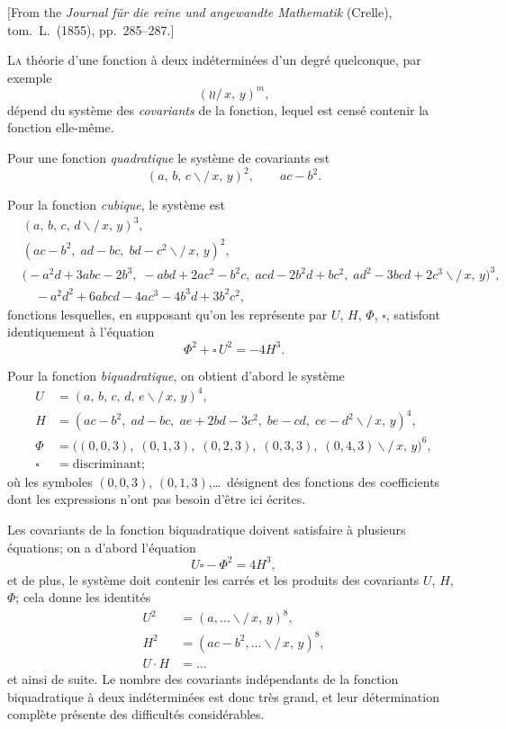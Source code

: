 \documentclass[11pt,a4paper]{book}
\begin{document}
[From the \textit{Journal f\"ur die reine und angewandte Mathematik} (Crelle),
tom.\ L.\ (1855), pp.\ 285--287.]

\medskip

\textsc{La} th\'eorie d'une fonction \`a deux ind\'etermin\'ees d'un degr\'e
quelconque, par exemple
\[
(\wr\wr\!\!\!/\,x,\, y)^m,
\]
d\'epend du syst\`eme des \textit{covariants} de la fonction, lequel est
cens\'e contenir la fonction elle-m\^eme.

Pour une fonction \textit{quadratique} le syst\`eme de covariants est
\[
(a,\, b,\, c\!\!\backslash\!\!\!/\,x,\, y)^2,\qquad ac-b^2.
\]

Pour la fonction \textit{cubique}, le syst\`eme est
\begin{align*}
&(a,\, b,\, c,\, d\!\!\backslash\!\!\!/\,x,\, y)^3, \\
&(ac-b^2,\; ad-bc,\; bd-c^2 \backslash\!\!\!/\,x,\, y)^2, \\
&\bigl(-a^2d + 3abc - 2b^3,\; -abd + 2ac^2 - b^2c,\;
acd - 2b^2d + bc^2,\; ad^2 - 3bcd + 2c^3 \backslash\!\!\!/\,x,\, y\bigr)^3, \\
&\quad -a^2d^2 + 6abcd - 4ac^3 - 4b^3d + 3b^2c^2,
\end{align*}
fonctions lesquelles, en supposant qu'on les repr\'esente par $U$, $H$,
$\Phi$, $\square$, satisfont identiquement \`a l'\'equation
\[
\Phi^2 + \square\,U^2 = -4H^3.
\]

Pour la fonction \textit{biquadratique}, on obtient d'abord le syst\`eme
\begin{align*}
U &= (a,\, b,\, c,\, d,\, e\!\!\backslash\!\!\!/\,x,\, y)^4, \\
H &= (ac-b^2,\; ad-bc,\; ae + 2bd - 3c^2,\; be-cd,\; ce-d^2
\backslash\!\!\!/\,x,\, y)^4, \\
\Phi &= \bigl( (0,0,3),\; (0,1,3),\; (0,2,3),\; (0,3,3),\;
(0,4,3) \backslash\!\!\!/\,x,\, y\bigr)^6, \\
\square &= \text{discriminant};
\end{align*}
o\`u les symboles $(0,0,3)$, $(0,1,3)$,\ldots\ d\'esignent des fonctions
des coefficients dont les expressions n'ont pas besoin d'\^etre ici
\'ecrites.

\medskip

Les covariants de la fonction biquadratique doivent satisfaire \`a
plusieurs \'equations; on a d'abord l'\'equation
\[
U\square - \Phi^2 = 4H^3,
\]
et de plus, le syst\`eme doit contenir les carr\'es et les produits des
covariants $U$, $H$, $\Phi$; cela donne les identit\'es
\begin{align*}
U^2 &= (a,\ldots \backslash\!\!\!/\,x,\, y)^8, \\
H^2 &= (ac-b^2,\ldots \backslash\!\!\!/\,x,\, y)^8, \\
U\cdot H &= \ldots
\end{align*}
et ainsi de suite. Le nombre des covariants ind\'ependants de la fonction
biquadratique \`a deux ind\'etermin\'ees est donc tr\`es grand, et leur
d\'etermination compl\`ete pr\'esente des difficult\'es consid\'erables.
\end{document}
